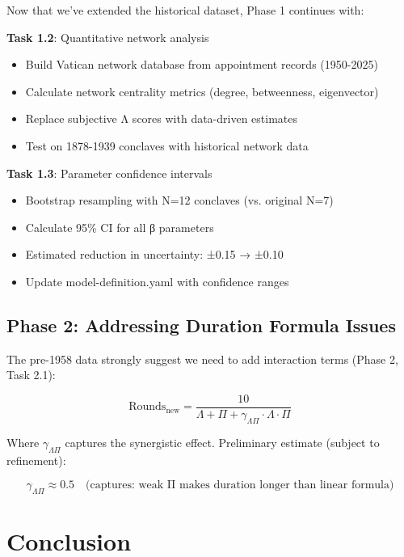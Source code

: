 Now that we've extended the historical dataset, Phase 1 continues with:

\textbf{Task 1.2}: Quantitative network analysis
\begin{itemize}
    \item Build Vatican network database from appointment records (1950-2025)
    \item Calculate network centrality metrics (degree, betweenness, eigenvector)
    \item Replace subjective Λ scores with data-driven estimates
    \item Test on 1878-1939 conclaves with historical network data
\end{itemize}

\textbf{Task 1.3}: Parameter confidence intervals
\begin{itemize}
    \item Bootstrap resampling with N=12 conclaves (vs. original N=7)
    \item Calculate 95\% CI for all β parameters
    \item Estimated reduction in uncertainty: ±0.15 → ±0.10
    \item Update model-definition.yaml with confidence ranges
\end{itemize}

\subsection{Phase 2: Addressing Duration Formula Issues}

The pre-1958 data strongly suggest we need to add interaction terms (Phase 2, Task 2.1):

\begin{equation}
\text{Rounds}_{\text{new}} = \frac{10}{\Lambda + \Pi + \gamma_{\Lambda\Pi} \cdot \Lambda \cdot \Pi}
\end{equation}

Where $\gamma_{\Lambda\Pi}$ captures the synergistic effect. Preliminary estimate (subject to refinement):

\begin{equation}
\gamma_{\Lambda\Pi} \approx 0.5 \quad \text{(captures: weak Π makes duration longer than linear formula)}
\end{equation}


\section{Conclusion}

